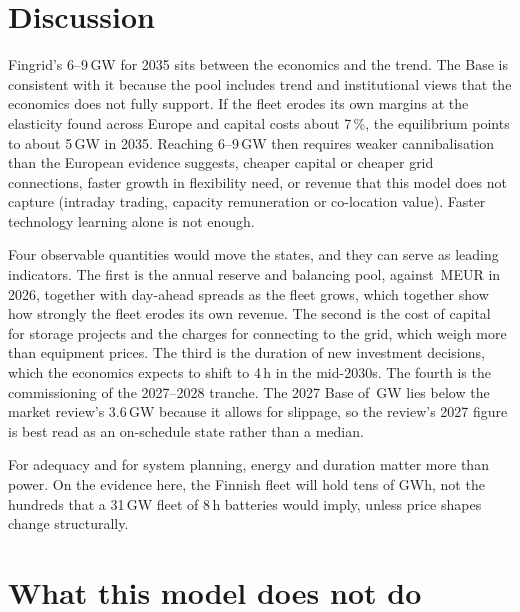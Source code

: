 \documentclass[11pt]{article}
\newcommand{\EUR}{EUR}
\begin{document}
\section{Discussion}\label{sec:discussion}

Fingrid's 6--9\,GW for 2035 sits between the economics and the trend.
The Base is consistent with it because the pool includes trend and institutional views that the economics does not fully support.
If the fleet erodes its own margins at the elasticity found across Europe and capital costs about 7\,\%, the equilibrium points to about 5\,GW in 2035.
Reaching 6--9\,GW then requires weaker cannibalisation than the European evidence suggests, cheaper capital or cheaper grid connections, faster growth in flexibility need, or revenue that this model does not capture (intraday trading, capacity remuneration or co-location value). Faster technology learning alone is not enough.

Four observable quantities would move the states, and they can serve as leading indicators.
The first is the annual reserve and balancing pool, against \,M\EUR{} in 2026, together with day-ahead spreads as the fleet grows, which together show how strongly the fleet erodes its own revenue.
The second is the cost of capital for storage projects and the charges for connecting to the grid, which weigh more than equipment prices.
The third is the duration of new investment decisions, which the economics expects to shift to 4\,h in the mid-2030s.
The fourth is the commissioning of the 2027--2028 tranche. The 2027 Base of \,GW lies below the market review's 3.6\,GW because it allows for slippage, so the review's 2027 figure is best read as an on-schedule state rather than a median.

For adequacy and for system planning, energy and duration matter more than power.
On the evidence here, the Finnish fleet will hold tens of GWh, not the hundreds that a 31\,GW fleet of 8\,h batteries would imply, unless price shapes change structurally.

\section{What this model does not do}\label{sec:limits}
\end{document}
